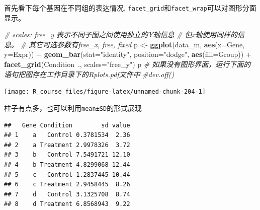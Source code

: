 \documentclass[]{article}
\newenvironment{Shaded}{\begin{snugshade}}{\end{snugshade}}
\newcommand{\KeywordTok}[1]{\textcolor[rgb]{0.13,0.29,0.53}{\textbf{{#1}}}}
\newcommand{\DataTypeTok}[1]{\textcolor[rgb]{0.13,0.29,0.53}{{#1}}}
\newcommand{\StringTok}[1]{\textcolor[rgb]{0.31,0.60,0.02}{{#1}}}
\newcommand{\CommentTok}[1]{\textcolor[rgb]{0.56,0.35,0.01}{\textit{{#1}}}}
\newcommand{\NormalTok}[1]{{#1}}
\numberwithin{figure}{section}
\numberwithin{table}{section}
\theoremstyle{definition}
\theoremstyle{definition}
\theoremstyle{definition}
\theoremstyle{remark}
\begin{document}
首先看下每个基因在不同组的表达情况,
\texttt{facet\_grid}和\texttt{facet\_wrap}可以对图形分面显示。

\begin{Shaded}
\begin{Highlighting}[]
\CommentTok{# scales: free_y 表示不同子图之间使用独立的Y轴信息}
\CommentTok{#         但x轴使用同样的信息。}
\CommentTok{#         其它可选参数有free_x, free, fixed}
\NormalTok{p <-}\StringTok{ }\KeywordTok{ggplot}\NormalTok{(data_m, }\KeywordTok{aes}\NormalTok{(}\DataTypeTok{x=}\NormalTok{Gene, }\DataTypeTok{y=}\NormalTok{Expr)) +}\StringTok{ }
\StringTok{    }\KeywordTok{geom_bar}\NormalTok{(}\DataTypeTok{stat=}\StringTok{"identity"}\NormalTok{, }\DataTypeTok{position=}\StringTok{"dodge"}\NormalTok{, }\KeywordTok{aes}\NormalTok{(}\DataTypeTok{fill=}\NormalTok{Group)) +}
\StringTok{    }\KeywordTok{facet_grid}\NormalTok{(Condition~., }\DataTypeTok{scales=}\StringTok{"free_y"}\NormalTok{)}
\NormalTok{p}
\CommentTok{# 如果没有图形界面，运行下面的语句把图存在工作目录下的Rplots.pdf文件中}
\CommentTok{#dev.off()}
\end{Highlighting}
\end{Shaded}

\begin{center}\texttt{[image: R\_course\_files/figure-latex/unnamed-chunk-204-1]} \end{center}

柱子有点多，也可以利用\texttt{mean±SD}的形式展现

\begin{Shaded}
\end{Shaded}

\begin{verbatim}
##   Gene Condition        sd value
## 1    a   Control 0.3781534  2.36
## 2    a Treatment 2.9978326  3.72
## 3    b   Control 7.5491721 12.10
## 4    b Treatment 4.8299068 12.44
## 5    c   Control 1.2837445 10.44
## 6    c Treatment 2.9458445  8.26
## 7    d   Control 3.1325708  8.74
## 8    d Treatment 6.8568943  9.22
\end{verbatim}
\end{document}

